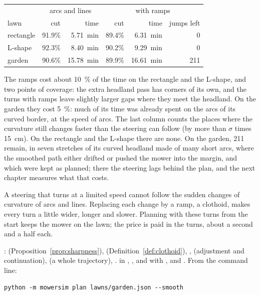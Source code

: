 \begin{center}
\begin{tabular}{@{}lrrrrr@{}}
  \toprule
  & \multicolumn{2}{c}{arcs and lines} & \multicolumn{3}{c}{with ramps} \\
  lawn & cut & time & cut & time & jumps left \\
  \midrule
  rectangle & 91.9\% & \SI{5.71}{\minute} & 89.4\% & \SI{6.31}{\minute} & 0 \\
  L-shape & 92.3\% & \SI{8.40}{\minute} & 90.2\% & \SI{9.29}{\minute} & 0 \\
  garden & 90.6\% & \SI{15.78}{\minute} & 89.9\% & \SI{16.61}{\minute} & 211 \\
  \bottomrule
\end{tabular}
\end{center}

The ramps cost about \SI{10}{\percent} of the time on the rectangle and the
L-shape, and two points of coverage: the extra headland pass has corners of
its own, and the turns with ramps leave slightly larger gaps where they
meet the headland. On the garden they cost \SI{5}{\percent}: much of its
time was already spent on the arcs of its curved border, at the speed of
arcs. The last column counts the places where the curvature still changes
faster than the steering can follow (by more than $\sigma$ times
\SI{15}{\centi\metre}). On the rectangle and the L-shape there are none. On
the garden, 211 remain, in seven stretches of its curved headland made of
many short arcs, where the smoothed path either drifted or pushed the mower
into the margin, and which were kept as planned; there the steering lags
behind the plan, and the next chapter measures what that costs.

\begin{inwords}
  A steering that turns at a limited speed cannot follow the sudden changes
  of curvature of arcs and lines. Replacing each change by a ramp, a
  clothoid, makes every turn a little wider, longer and slower. Planning
  with these turns from the start keeps the mower on the lawn; the price
  is paid in the turns, about a second and a half each.
\end{inwords}

\begin{incode}
  : 
  (Proposition~\ref{prop:sharpness}),  (Definition~\ref{def:clothoid}),
  ,  (adjustment and continuation),
   (a whole trajectory), .
   in ,
  ,  and  with
  , and . From the command
  line:
  \begin{verbatim}
python -m mowersim plan lawns/garden.json --smooth
  \end{verbatim}
\end{incode}
